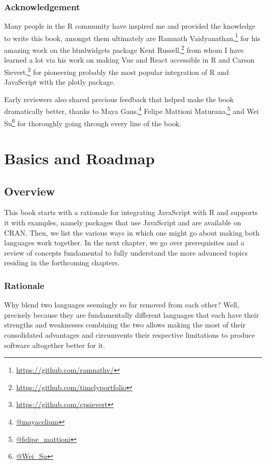 \documentclass[10pt,]{krantz}
\renewcommand{\href}[2]{#2\footnote{\url{#1}}}
\begin{document}
\hypertarget{acknowledgement}{%
\section*{Acknowledgement}\label{acknowledgement}}


Many people in the R community have inspired me and provided the knowledge to write this book, amongst them ultimately are \href{https://github.com/ramnathv/}{Ramnath Vaidyanathan,} for his amazing work on the htmlwidgets \citep{R-htmlwidgets} package \href{https://github.com/timelyportfolio}{Kent Russell,} from whom I have learned a lot via his work on making Vue and React accessible in R and \href{https://github.com/cpsievert}{Carson Sievert,} for pioneering probably the most popular integration of R and JavaScript with the plotly \citep{R-plotly} package.

Early reviewers also shared precious feedback that helped make the book dramatically better, thanks to \href{@mayacelium}{Maya Gans,} \href{@felipe_mattioni}{Felipe Mattioni Maturana,} and \href{@Wei_Su}{Wei Su} for thoroughly going through every line of the book.

\mainmatter

\hypertarget{part-basics-and-roadmap}{%
\part{Basics and Roadmap}\label{part-basics-and-roadmap}}

\hypertarget{intro-overview}{%
\chapter{Overview}\label{intro-overview}}

This book starts with a rationale for integrating JavaScript with R and supports it with examples, namely packages that use JavaScript and are available on CRAN. Then, we list the various ways in which one might go about making both languages work together. In the next chapter, we go over prerequisites and a review of concepts fundamental to fully understand the more advanced topics residing in the forthcoming chapters.

\hypertarget{intro-overview-rationale}{%
\section{Rationale}\label{intro-overview-rationale}}

Why blend two languages seemingly so far removed from each other? Well, precisely because they are fundamentally different languages that each have their strengths and weaknesses combining the two allows making the most of their consolidated advantages and circumvents their respective limitations to produce software altogether better for it.
\end{document}
